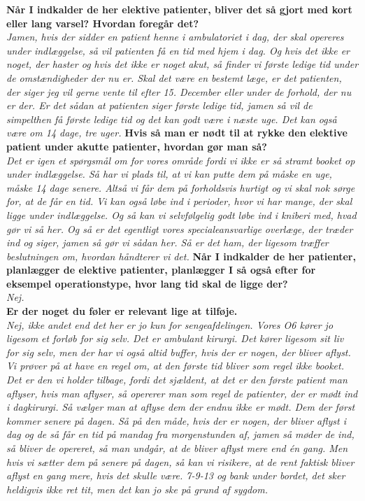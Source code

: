 \textbf{Når I indkalder de her elektive patienter, bliver det så gjort med kort eller lang varsel? Hvordan foregår det?}\\
\noindent
\textit{Jamen, hvis der sidder en patient henne i ambulatoriet i dag, der skal opereres under indlæggelse, så vil patienten få en tid med hjem i dag. Og hvis det ikke er noget, der haster og hvis det ikke er noget akut, så finder vi første ledige tid under de omstændigheder der nu er. Skal det være en bestemt læge, er det patienten, der siger jeg vil gerne vente til efter 15. December eller under de forhold, der nu er der. Er det sådan at patienten siger første ledige tid, jamen så vil de simpelthen få første ledige tid og det kan godt være i næste uge. Det kan også være om 14 dage, tre uger.}
\textbf{Hvis så man er nødt til at rykke den elektive patient under akutte patienter, hvordan gør man så?}\\
\noindent
\textit{Det er igen et spørgsmål om for vores område fordi vi ikke er så stramt booket op under indlæggelse. Så har vi plads til, at vi kan putte dem på måske en uge, måske 14 dage senere. Altså vi får dem på forholdsvis hurtigt og vi skal nok sørge for, at de får en tid. Vi kan også løbe ind i perioder, hvor vi har mange, der skal ligge under indlæggelse. Og så kan vi selvfølgelig godt løbe ind i kniberi med, hvad gør vi så her. Og så er det egentligt vores specialeansvarlige overlæge, der træder ind og siger, jamen så gør vi sådan her. Så er det ham, der ligesom træffer beslutningen om, hvordan håndterer vi det.} 
\textbf{Når I indkalder de her patienter, planlægger de elektive patienter, planlægger I så også efter for eksempel operationstype, hvor lang tid skal de ligge der?}\\
\noindent
\textit{Nej.} \\
\noindent
\textbf{Er der noget du føler er relevant lige at tilføje.} \\
\noindent
\textit{Nej, ikke andet end det her er jo kun for sengeafdelingen. Vores O6 kører jo ligesom et forløb for sig selv. Det er ambulant kirurgi. Det kører ligesom sit liv for sig selv, men der har vi også altid buffer, hvis der er nogen, der bliver aflyst. Vi prøver på at have en regel om, at den første tid bliver som regel ikke booket. Det er den vi holder tilbage, fordi det sjældent, at det er den første patient man aflyser, hvis man aflyser, så opererer man som regel de patienter, der er mødt ind i dagkirurgi. Så vælger man at aflyse dem der endnu ikke er mødt. Dem der først kommer senere på dagen. Så på den måde, hvis der er nogen, der bliver aflyst i dag og de så får en tid på mandag fra morgenstunden af, jamen så møder de ind, så bliver de opereret, så man undgår, at de bliver aflyst mere end én gang. Men hvis vi sætter dem på senere på dagen, så kan vi risikere, at de rent faktisk bliver aflyst en gang mere, hvis det skulle være. 7-9-13 og bank under bordet, det sker heldigvis ikke ret tit, men det kan jo ske på grund af sygdom.} \\
